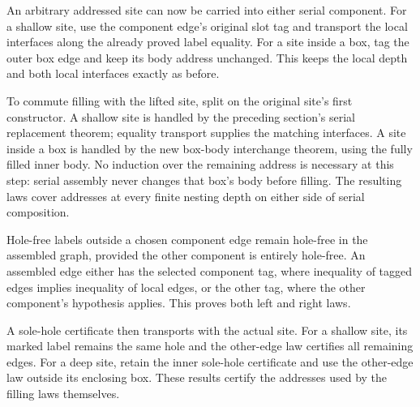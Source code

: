 



An arbitrary addressed site can now be carried into either serial component.
For a shallow site, use the component edge's original slot tag and transport
the local interfaces along the already proved label equality. For a site
inside a box, tag the outer box edge and keep its body address unchanged.
This keeps the local depth and both local interfaces exactly as before.

To commute filling with the lifted site, split on the original site's first
constructor. A shallow site is handled by the preceding section's serial
replacement theorem; equality transport supplies the matching interfaces.
A site inside a box is handled by the new box-body interchange theorem,
using the fully filled inner body. No induction over the remaining address
is necessary at this step: serial assembly never changes that box's body
before filling. The resulting laws cover addresses at every finite nesting
depth on either side of serial composition.









Hole-free labels outside a chosen component edge remain hole-free in the
assembled graph, provided the other component is entirely hole-free. An
assembled edge either has the selected component tag, where inequality of
tagged edges implies inequality of local edges, or the other tag, where the
other component's hypothesis applies. This proves both left and right laws.

A sole-hole certificate then transports with the actual site. For a shallow
site, its marked label remains the same hole and the other-edge law certifies
all remaining edges. For a deep site, retain the inner sole-hole certificate
and use the other-edge law outside its enclosing box. These results certify
the addresses used by the filling laws themselves.




